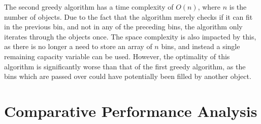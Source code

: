\documentclass[11pt]{article}
\begin{document}
The second greedy algorithm has a time complexity of ${O(n)}$, where ${n}$ is the number of objects.
Due to the fact that the algorithm merely checks if it can fit in the previous bin, and not in any
of the preceding bins, the algorithm only iterates through the objects once. The space complexity is
also impacted by this, as there is no longer a need to store an array of ${n}$ bins, and instead a
single remaining capacity variable can be used. However, the optimality of this algorithm is
significantly worse than that of the first greedy algorithm, as the bins which are passed over could
have potentially been filled by another object.


\section{Comparative Performance Analysis}
\end{document}
